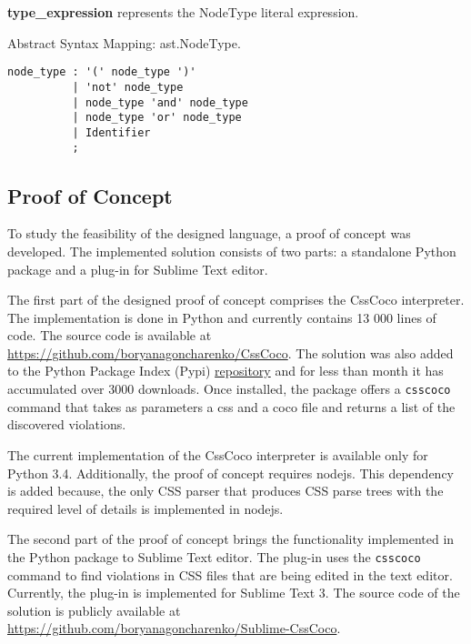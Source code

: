 \begin{description}
\item\textbf{type\_expression} represents the NodeType literal expression.

Abstract Syntax Mapping: ast.NodeType.

\begin{snippet}
\begin{verbatim}
node_type : '(' node_type ')'
          | 'not' node_type
          | node_type 'and' node_type
          | node_type 'or' node_type
          | Identifier
          ;
\end{verbatim}
\end{snippet}

\end{description}

\subsection{Proof of Concept}

To study the feasibility of the designed language, a proof of concept was
developed. The implemented solution consists of two parts: a standalone
Python package and a plug-in for Sublime Text editor.

The first part of the designed proof of concept comprises the CssCoco
interpreter. The implementation is done in Python and currently contains 13
000 lines of code. The source code is available at
\url{https://github.com/boryanagoncharenko/CssCoco}. The solution was also
added to the Python Package Index (Pypi)
\href{https://pypi.python.org/pypi?:action=display&name=csscoco}{repository}
and for less than month it has accumulated over 3000 downloads. Once
installed, the package offers a \texttt{csscoco} command that takes as
parameters a css and a coco file and returns a list of the discovered
violations.

The current implementation of the CssCoco interpreter is available only for
Python 3.4. Additionally, the proof of concept requires nodejs. This
dependency is added because, the only CSS parser that produces CSS parse
trees with the required level of details is implemented in nodejs.

The second part of the proof of concept brings the functionality implemented
in the Python package to Sublime Text editor. The plug-in uses the
\texttt{csscoco} command to find violations in CSS files that are being edited
in the text editor. Currently, the plug-in is implemented for Sublime Text 3.
The source code of the solution is publicly available at
\url{https://github.com/boryanagoncharenko/Sublime-CssCoco}.

